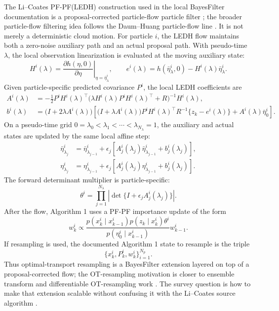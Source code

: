 \documentclass[11pt]{article}
\begin{document}
The Li--Coates PF-PF(LEDH) construction used in the local BayesFilter
documentation is a proposal-corrected particle-flow particle filter
\citep{li2017particle}; the broader particle-flow filtering idea follows the
Daum--Huang particle-flow line \citep{daumhuang2008}.  It is not
merely a deterministic cloud motion.  For particle $i$, the LEDH flow maintains
both a zero-noise auxiliary path and an actual proposal path.  With pseudo-time
$\lambda$, the local observation linearization is evaluated at the moving
auxiliary state:
\begin{equation}
H^i(\lambda)
=
\left.
\frac{\partial h(\eta,0)}{\partial \eta}
\right|_{\eta=\bar\eta^i_\lambda},
\qquad
e^i(\lambda)
=
h(\bar\eta^i_\lambda,0)-H^i(\lambda)\bar\eta^i_\lambda .
\label{eq:ledh-local-jacobian}
\end{equation}
Given particle-specific predicted covariance $P^i$, the local LEDH coefficients
are
\begin{align}
A^i(\lambda)
&=
-\frac{1}{2}
P^i H^i(\lambda)^\top
\bigl(\lambda H^i(\lambda)P^iH^i(\lambda)^\top+R\bigr)^{-1}
H^i(\lambda),
\label{eq:ledh-A}\\
b^i(\lambda)
&=
\bigl(I+2\lambda A^i(\lambda)\bigr)
\left[
  \bigl(I+\lambda A^i(\lambda)\bigr)
  P^i H^i(\lambda)^\top R^{-1}\{z_k-e^i(\lambda)\}
  + A^i(\lambda)\bar\eta_0^i
\right].
\label{eq:ledh-b}
\end{align}
On a pseudo-time grid
$0=\lambda_0<\lambda_1<\cdots<\lambda_{N_\lambda}=1$, the auxiliary and actual
states are updated by the same local affine step:
\begin{align}
\bar\eta^i_{\lambda_j}
&=
\bar\eta^i_{\lambda_{j-1}}
+ \epsilon_j
\left[
  A_j^i(\lambda_j)\bar\eta^i_{\lambda_{j-1}}
  + b_j^i(\lambda_j)
\right],
\label{eq:aux-step}\\
\eta^i_{\lambda_j}
&=
\eta^i_{\lambda_{j-1}}
+ \epsilon_j
\left[
  A_j^i(\lambda_j)\eta^i_{\lambda_{j-1}}
  + b_j^i(\lambda_j)
\right].
\label{eq:actual-step}
\end{align}
The forward determinant multiplier is particle-specific:
\begin{equation}
\theta^i
=
\prod_{j=1}^{N_\lambda}
\left|\det\{I+\epsilon_j A_j^i(\lambda_j)\}\right|.
\label{eq:theta-product}
\end{equation}
After the flow, Algorithm 1 uses a PF-PF importance update of the form
\begin{equation}
w_k^i
\propto
\frac{
  p(x_k^i\mid x_{k-1}^i)
  p(z_k\mid x_k^i)
  \theta^i
}{
  p(\eta_0^i\mid x_{k-1}^i)
}
w_{k-1}^i .
\label{eq:pfpf-weight}
\end{equation}
If resampling is used, the documented Algorithm 1 state to resample is the
triple
\begin{equation}
\{x_k^i,P_k^i,w_k^i\}_{i=1}^{N_p}.
\label{eq:resampling-triple}
\end{equation}
Thus optimal-transport resampling is a BayesFilter extension layered on top of
a proposal-corrected flow; the OT-resampling motivation is closer to ensemble
transform and differentiable OT-resampling work
\citep{reich2013nonparametric,corenflos2021differentiable}.  The survey
question is how to make that extension scalable without confusing it with the
Li--Coates source algorithm \citep{li2017particle}.
\end{document}
